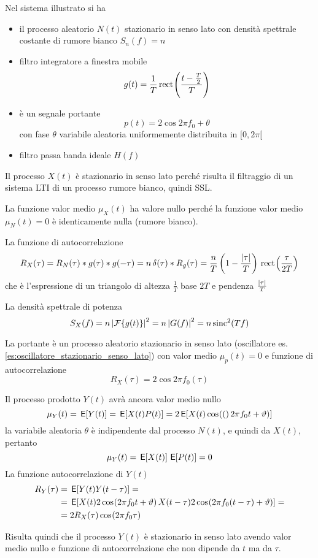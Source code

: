 Nel sistema illustrato si ha
\begin{itemize}
\item il processo aleatorio $N(t)$ stazionario in senso lato con densità spettrale costante di rumore bianco $S_n(f)=n$
\item filtro integratore a finestra mobile
\[
	g(t)=\frac{1}{T}\,{\operatorname{rect}}^{}\!\left({\frac{t-\frac{T}{2}}{T}}\right)
\]
\item è un segnale portante
\[
	p(t)=2\cos{2\pi f_0+\theta}
\]
con fase $\theta$ variabile aleatoria uniformemente distribuita in $[0,2\pi[$
\item filtro passa banda ideale $H(f)$
\end{itemize}

Il processo $X(t)$ è stazionario in senso lato perché risulta il filtraggio di un sistema LTI di un processo rumore bianco, quindi SSL.

La funzione valor medio $\mu_X(t)$ ha valore nullo perché la funzione valor medio $\mu_N(t)=0$ è identicamente nulla (rumore bianco).

La funzione di autocorrelazione
\[
	R_X(\tau)=R_N(\tau)\ast g(\tau)\ast g(-\tau)=n\operatorname{\delta}(\tau)\ast R_g(\tau)= \frac{n}{T}\left(1-\frac{\left|{\tau}\right|}{T}\right)\,{\operatorname{rect}}^{}\!\left({\frac{\tau}{2T}}\right)
\]
che è l'espressione di un triangolo di altezza $\frac{1}{T}$ base $2T$ e pendenza $\frac{\left|{\tau}\right|}{T}$

La densità spettrale di potenza
\[
	S_X(f)=n \left|{\operatorname{\mathcal{F}}\!\left\lbrace{g(t)}\right\rbrace}\right|^2=n\left|{G(f)}\right|^2=n\operatorname{sinc}^2(T f)
\]

La portante è un processo aleatorio stazionario in senso lato (oscillatore es.\ref{es:oscillatore_stazionario_senso_lato}) con valor medio $\mu_p(t)=0$ e funzione di autocorrelazione
\[
	R_X(\tau)=2\cos{2\pi f_0(\tau)}
\]

Il processo prodotto $Y(t)$ avrà ancora valor medio nullo
\[
	\mu_Y(t)=\,{\operatorname{\mathsf{E}}}\!\left[{Y(t)}\right]=\,{\operatorname{\mathsf{E}}}\!\left[{X(t)P(t)}\right]=2 \,{\operatorname{\mathsf{E}}}\!\left[{X(t)\,{\operatorname{cos}}^{}\!\left({(}\right)2\pi f_0 t+\vartheta)}\right]
\]
la variabile aleatoria $\theta$ è indipendente dal processo $N(t)$, e quindi da $X(t)$, pertanto
\[
	\mu_Y(t)=\,{\operatorname{\mathsf{E}}}\!\left[{X(t)}\right]\,{\operatorname{\mathsf{E}}}\!\left[{P(t)}\right]=0
\]
La funzione autocorrelazione di $Y(t)$
\[
	\begin{split}
		R_Y(\tau)&=\,{\operatorname{\mathsf{E}}}\!\left[{Y(t)Y(t-\tau)}\right]=\\
		&=\,{\operatorname{\mathsf{E}}}\!\left[{X(t)2\,{\operatorname{cos}}^{}\!\left({2\pi f_0 t+\vartheta}\right) X(t-\tau)2\,{\operatorname{cos}}^{}\!\left({2\pi f_0 (t-\tau)+\vartheta}\right)}\right]=\\
		&=2 R_X(\tau)\,{\operatorname{cos}}^{}\!\left({2\pi f_0\tau}\right)
	\end{split}
\]

Risulta quindi che il processo $Y(t)$ è stazionario in senso lato avendo valor medio nullo e funzione di autocorrelazione che non dipende da $t$ ma da $\tau$.

